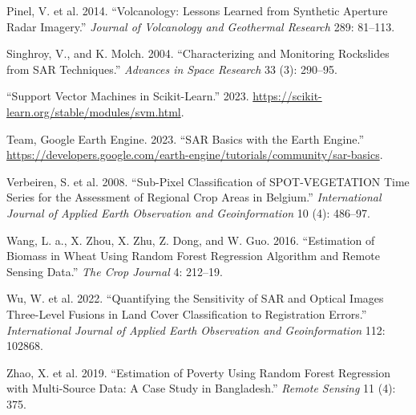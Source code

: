 \documentclass[
  letterpaper,
  DIV=11,
  numbers=noendperiod]{scrreprt}
\newlength{\cslhangindent}
\newenvironment{CSLReferences}[2] %
 {\begin{list}{}{%
  \setlength{\itemindent}{0pt}
  \setlength{\leftmargin}{0pt}
  \setlength{\parsep}{0pt}
  \ifodd #1
   \setlength{\leftmargin}{\cslhangindent}
   \setlength{\itemindent}{-1\cslhangindent}
  \fi
  \setlength{\itemsep}{#2\baselineskip}}}
 {\end{list}}
\begin{document}
\begin{CSLReferences}{1}{0}
Pinel, V. et al. 2014. {``Volcanology: Lessons Learned from Synthetic
Aperture Radar Imagery.''} \emph{Journal of Volcanology and Geothermal
Research} 289: 81--113.

Singhroy, V., and K. Molch. 2004. {``Characterizing and Monitoring
Rockslides from SAR Techniques.''} \emph{Advances in Space Research} 33
(3): 290--95.

{``Support Vector Machines in Scikit-Learn.''} 2023.
\url{https://scikit-learn.org/stable/modules/svm.html}.

Team, Google Earth Engine. 2023. {``SAR Basics with the Earth Engine.''}
\url{https://developers.google.com/earth-engine/tutorials/community/sar-basics}.

Verbeiren, S. et al. 2008. {``Sub-Pixel Classification of
SPOT-VEGETATION Time Series for the Assessment of Regional Crop Areas in
Belgium.''} \emph{International Journal of Applied Earth Observation and
Geoinformation} 10 (4): 486--97.

Wang, L. a., X. Zhou, X. Zhu, Z. Dong, and W. Guo. 2016. {``Estimation
of Biomass in Wheat Using Random Forest Regression Algorithm and Remote
Sensing Data.''} \emph{The Crop Journal} 4: 212--19.

Wu, W. et al. 2022. {``Quantifying the Sensitivity of SAR and Optical
Images Three-Level Fusions in Land Cover Classification to Registration
Errors.''} \emph{International Journal of Applied Earth Observation and
Geoinformation} 112: 102868.

Zhao, X. et al. 2019. {``Estimation of Poverty Using Random Forest
Regression with Multi-Source Data: A Case Study in Bangladesh.''}
\emph{Remote Sensing} 11 (4): 375.

\end{CSLReferences}
\end{document}
